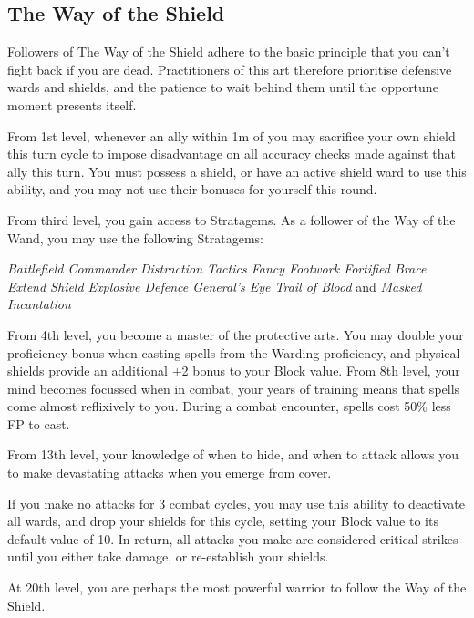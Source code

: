 {\subsection{\bf The Way of the Shield}

Followers of The Way of the Shield adhere to the basic principle that you can't fight back if you are dead. Practitioners of this art therefore prioritise defensive wards and shields, and the patience to wait behind them until the opportune moment presents itself. 


From 1st level, whenever an ally within 1m of you may sacrifice your own shield this turn cycle to impose disadvantage on all accuracy checks made against that ally this turn. You must possess a shield, or have an active shield ward to use this ability, and you may not use their bonuses for yourself this round. 



From third level, you gain access to Stratagems. As a follower of the Way of the Wand, you may use the following Stratagems:

{\it 
Battlefield Commander\comma{} Distraction Tactics\comma{} Fancy Footwork\comma{} Fortified Brace\comma{} Extend Shield\comma{} Explosive Defence\comma{} General’s Eye\comma{} Trail of Blood } and {\it Masked Incantation
}

{
	From 4th level, you become a master of the protective arts. 	You may double your proficiency bonus when casting spells from the Warding proficiency, and physical shields provide an additional +2 bonus to your Block value. 
}
{
	From 8th level, your mind becomes focussed when in combat, your years of training means that spells come almost reflixively to you. During a combat encounter, spells cost 50\% less FP to cast. 
}
{
	From 13th level, your knowledge of when to hide, and when to attack allows you to make devastating attacks when you emerge from cover.  
	
	If you make no attacks for 3 combat cycles, you may use this ability to deactivate all wards, and drop your shields for this cycle, setting your Block value to its default value of 10. In return, all attacks you make are considered critical strikes until you either take damage, or re-establish your shields. 
}
{
	At 20th level, you are perhaps the most powerful warrior to follow the Way of the Shield. 
	
}}
